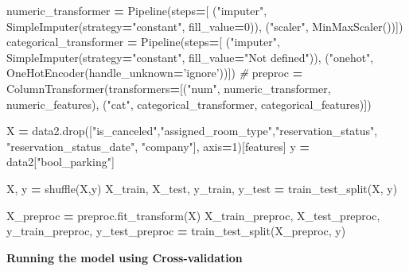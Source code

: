 \documentclass[10pt,a4paper]{article}
\newenvironment{Shaded}{\begin{snugshade}}{\end{snugshade}}
\newcommand{\CommentTok}[1]{\textcolor[rgb]{0.56,0.35,0.01}{\textit{#1}}}
\newcommand{\DecValTok}[1]{\textcolor[rgb]{0.00,0.00,0.81}{#1}}
\newcommand{\NormalTok}[1]{#1}
\newcommand{\OperatorTok}[1]{\textcolor[rgb]{0.81,0.36,0.00}{\textbf{#1}}}
\newcommand{\StringTok}[1]{\textcolor[rgb]{0.31,0.60,0.02}{#1}}
\theoremstyle{break}
\begin{document}
\begin{Shaded}
\begin{Highlighting}[]
\NormalTok{numeric_transformer }\OperatorTok{=}\NormalTok{ Pipeline(steps}\OperatorTok{=}\NormalTok{[}
\NormalTok{                                    (}\StringTok{"imputer"}\NormalTok{, SimpleImputer(strategy}\OperatorTok{=}\StringTok{"constant"}\NormalTok{, fill_value}\OperatorTok{=}\DecValTok{0}\NormalTok{)),}
\NormalTok{                                    (}\StringTok{"scaler"}\NormalTok{, MinMaxScaler())]) }
\NormalTok{categorical_transformer }\OperatorTok{=}\NormalTok{ Pipeline(steps}\OperatorTok{=}\NormalTok{[}
\NormalTok{                                    (}\StringTok{"imputer"}\NormalTok{, SimpleImputer(strategy}\OperatorTok{=}\StringTok{"constant"}\NormalTok{,}
\NormalTok{                                    fill_value}\OperatorTok{=}\StringTok{"Not defined"}\NormalTok{)),}
\NormalTok{                                    (}\StringTok{"onehot"}\NormalTok{, OneHotEncoder(handle_unknown}\OperatorTok{=}\StringTok{'ignore'}\NormalTok{))]) }\CommentTok{#}
\NormalTok{preproc }\OperatorTok{=}\NormalTok{ ColumnTransformer(transformers}\OperatorTok{=}\NormalTok{[(}\StringTok{"num"}\NormalTok{, numeric_transformer, numeric_features),}
\NormalTok{                                          (}\StringTok{"cat"}\NormalTok{, categorical_transformer, categorical_features)])}

\NormalTok{X }\OperatorTok{=}\NormalTok{ data2.drop([}\StringTok{"is_canceled"}\NormalTok{,}\StringTok{"assigned_room_type"}\NormalTok{,}\StringTok{"reservation_status"}\NormalTok{,}
\StringTok{"reservation_status_date"}\NormalTok{, }\StringTok{"company"}\NormalTok{],}
\NormalTok{              axis}\OperatorTok{=}\DecValTok{1}\NormalTok{)[features]}
\NormalTok{y }\OperatorTok{=}\NormalTok{ data2[}\StringTok{"bool_parking"}\NormalTok{]}

\NormalTok{X, y }\OperatorTok{=}\NormalTok{ shuffle(X,y)}
\NormalTok{X_train, X_test, y_train, y_test }\OperatorTok{=}\NormalTok{ train_test_split(X, y)}

\NormalTok{X_preproc }\OperatorTok{=}\NormalTok{ preproc.fit_transform(X)}
\NormalTok{X_train_preproc, X_test_preproc, y_train_preproc, y_test_preproc }\OperatorTok{=}\NormalTok{ train_test_split(X_preproc, y)}
\end{Highlighting}
\end{Shaded}

\textbf{Running the model using Cross-validation}
\end{document}

